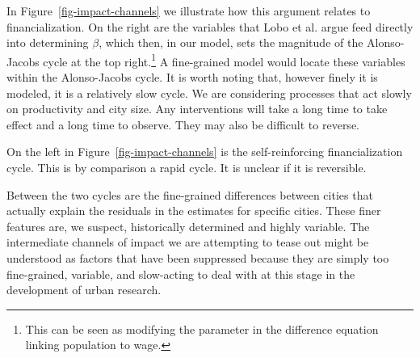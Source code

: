 In Figure~\ref{fig-impact-channels} we illustrate how this argument relates to financialization. On the right are the variables that Lobo et al. \cite{loboUrbanScalingProduction2013} argue feed directly into determining $\beta$, which then, in our model, sets the magnitude of the \gls{Alonso-Jacobs cycle} at the top right.\footnote{This can be seen as modifying the parameter in the difference equation linking population to wage.} A fine-grained model would locate these variables within the Alonso-Jacobs cycle. It is worth noting that, however finely it is modeled, it is a relatively slow cycle. We are considering processes that act slowly on productivity and city size. Any interventions will take a long time to take effect and a long time to observe. They may also be difficult to reverse. 


 
On the left in Figure~\ref{fig-impact-channels} is the self-reinforcing %
financialization cycle. This is by comparison a rapid cycle. It is unclear if it is reversible. 
 
Between the two cycles are the fine-grained differences between cities that actually explain the residuals in the estimates for specific cities. These finer features are, we suspect, historically determined and highly variable. The intermediate channels of impact we are attempting to tease out %
might be understood as factors that have been suppressed because they are simply too fine-grained, variable, and slow-acting  to deal with at this stage in the development of urban research.









